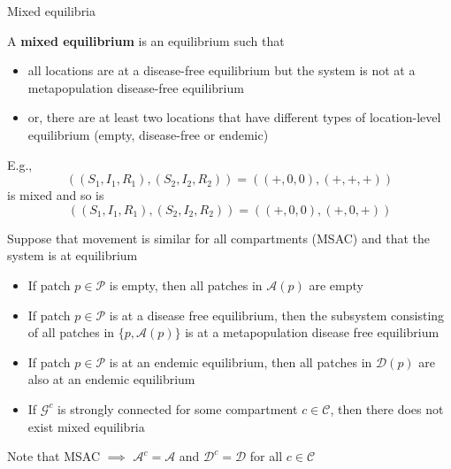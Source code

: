 \documentclass[aspectratio=43]{beamer}
\begin{document}
\begin{frame}{Mixed equilibria}
	\begin{definition}
		A \textbf{mixed equilibrium} is an equilibrium such that
		\begin{itemize}
			\item all locations are at a disease-free equilibrium but the system is not at a metapopulation disease-free equilibrium
			\item or, there are at least two locations that have different types of location-level equilibrium (empty, disease-free or endemic)
		\end{itemize}
	\end{definition}
	E.g., 
	$$
	((S_1,I_1,R_1),(S_2,I_2,R_2))=((+,0,0),(+,+,+))
	$$
	is mixed and so is
	$$
	((S_1,I_1,R_1),(S_2,I_2,R_2))=((+,0,0),(+,0,+))
	$$
\end{frame}


\begin{frame}
	\begin{theorem}
		Suppose that movement is similar for all compartments (MSAC) and that the system is at equilibrium
		\begin{itemize}
			\item If patch $p\in\mathcal{P}$ is empty, then all patches in $\mathcal{A}(p)$ are empty 
			\item If patch $p\in\mathcal{P}$ is at a disease free equilibrium, then the subsystem consisting of all patches in $\{p,\mathcal{A}(p)\}$ is at a metapopulation disease free equilibrium 
			\item If patch $p\in\mathcal{P}$ is at an endemic equilibrium, then all patches in $\mathcal{D}(p)$ are also at an endemic equilibrium
			\item If $\mathcal{G}^c$ is strongly connected for some compartment $c\in\mathcal{C}$, then there does not exist mixed equilibria
		\end{itemize}
	\end{theorem}
	Note that MSAC $\implies$ $\mathcal{A}^c=\mathcal{A}$ and $\mathcal{D}^c=\mathcal{D}$ for all $c\in\mathcal{C}$
\end{frame}
\end{document}
